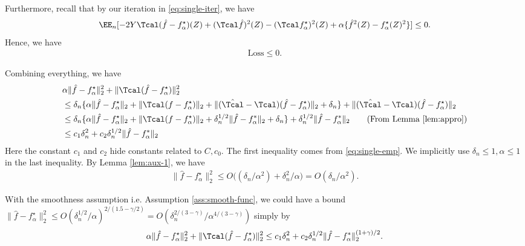 \documentclass[12pt]{extarticle} %
\begin{document}
Furthermore, recall that by our iteration in \eqref{eq:single-iter}, we have
\begin{align*}
     \EE_n[  - 2 Y  \Tcal (\hat f-f^{\star}_{\alpha})(Z)  + (\Tcal \hat f)^2(Z) - (\Tcal f^{\star}_{\alpha})^2(Z)+ \alpha\{\hat f^2(Z)- f^{\star}_{\alpha}(Z)^2 \} ]\leq 0. 
\end{align*}
Hence, we have 
\begin{align}\label{eq:single-loss}
    \mathrm{Loss}\leq 0. 
\end{align}

Combining everything, we have 
\begin{align*}
    &\alpha \|\hat f - f^{\star}_{\alpha} \|^2_2 + \|\Tcal(\hat f-f^{\star}_{\alpha})\|^2_2 \\
    & \leq \delta_n\{ \alpha \|\hat f-f^{\star}_{\alpha}\|_2 + \|\Tcal(f-f^{\star}_{\alpha})\|_2 +  \|(\hat \Tcal-\Tcal)(\hat f-f^{\star}_{\alpha})\|_2+   \delta_n   \}+  \|(\hat \Tcal-\Tcal)(\hat f-f^{\star}_{\alpha})\|_2 \\ 
     & \leq \delta_n\{ \alpha \|\hat f-f^{\star}_{\alpha}\|_{2} + \|\Tcal(f-f^{\star}_{\alpha})\|_2 +   \delta_n^{1/2} \|\hat{f} - f_\alpha^*\|_2+   \delta_n   \}+  \delta_n^{1/2} \|\hat{f} - f_\alpha^*\|_2\tag{From Lemma \eqref{lem:appro}} \\
     &\leq c_1 \delta^2_n  + c_2 \delta_n^{1/2} \|\hat{f} - f_\alpha^*\|_2
\end{align*}
Here the constant $c_1$ and $c_2$ hide constants related to $C, c_0$. The first inequality comes from \eqref{eq:single-emp}. We implicitly use $\delta_n\leq 1, \alpha \leq 1$ in the last inequality. 
By Lemma \ref{lem:aux-1}, we have 
\begin{align*}
\|\hat f - f^{\star}_{\alpha} \|^2_2 \leq  O( (\delta_n / \alpha^2)  + \delta_n^2 / \alpha\big) = O(\delta_n / \alpha^2).
\end{align*}
\begin{remark}
    With the smoothness assumption i.e. Assumption \ref{ass:smooth-func}, we could have a bound $\|\hat f - f^{\star}_{\alpha} \|^2_2 \leq O(\delta_n^{1/2}/\alpha)^{2/(1.5 - \gamma/2)} = O(\delta_n^{2/(3-\gamma)} / \alpha^{4 / (3-\gamma)})$ simply by $$
    \alpha \|\hat f - f^{\star}_{\alpha} \|^2_2 + \|\Tcal(\hat f-f^{\star}_{\alpha})\|^2_2 \leq c_1 \delta_n^2 + c_2 \delta_n^{1/2}\|\hat{f} - f_\alpha^*\|_2^{(1+\gamma)/2}.
    $$
\end{remark}
\end{document}
